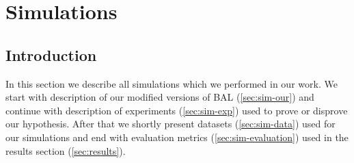 
\section{Simulations}
\label{sec:simulations} 

\subsection*{Introduction} 
In this section we describe all simulations which we performed in our work. We start with description of our modified versions of BAL (\ref{sec:sim-our}) and continue with description of experiments (\ref{sec:sim-exp}) used to prove or disprove our hypothesis. After that we shortly present datasets (\ref{sec:sim-data}) used for our simulations and end with evaluation metrics (\ref{sec:sim-evaluation}) used in the results section (\ref{sec:results}). 

 

 



 
